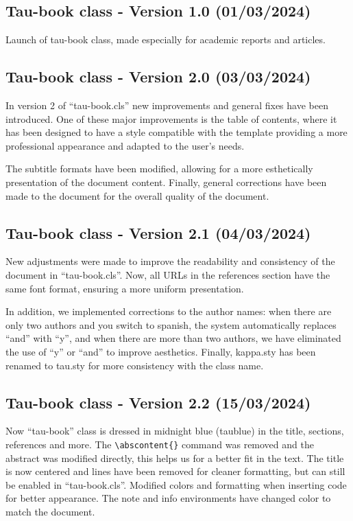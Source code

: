 \documentclass[10pt,a4paper,twoside]{tau-book}
\begin{document}
    \subsection{Tau-book class - Version 1.0 (01/03/2024)}
	
        Launch of tau-book class, made especially for academic reports and articles.

    \subsection{Tau-book class - Version 2.0 (03/03/2024)}

        In version 2 of ``tau-book.cls'' new improvements and general fixes have been introduced. One of these major improvements is the table of contents, where it has been designed to have a style compatible with the template providing a more professional appearance and adapted to the user's needs. 

        The subtitle formats have been modified, allowing for a more esthetically presentation of the document content. Finally, general corrections have been made to the document for the overall quality of the document.

    \subsection{Tau-book class - Version 2.1 (04/03/2024)}

        New adjustments were made to improve the readability and consistency of the document in ``tau-book.cls''. Now, all URLs in the references section have the same font format, ensuring a more uniform presentation.

        In addition, we implemented corrections to the author names: when there are only two authors and you switch to spanish, the system automatically replaces ``and'' with ``y'', and when there are more than two authors, we have eliminated the use of ``y'' or ``and'' to improve aesthetics. Finally, kappa.sty has been renamed to tau.sty for more consistency with the class name.
        
    \subsection{Tau-book class - Version 2.2 (15/03/2024)}
	
        Now ``tau-book'' class is dressed in \textcolor{taublue}{midnight blue} (taublue) in the title, sections, references and more. The \verb*|\abscontent{}| command was removed and the abstract was modified directly, this helps us for a better fit in the text. The title is now centered and lines have been removed for cleaner formatting, but can still be enabled in ``tau-book.cls''. Modified colors and formatting when inserting code for better appearance. The note and info environments have changed color to match the document.
        
\end{document}
